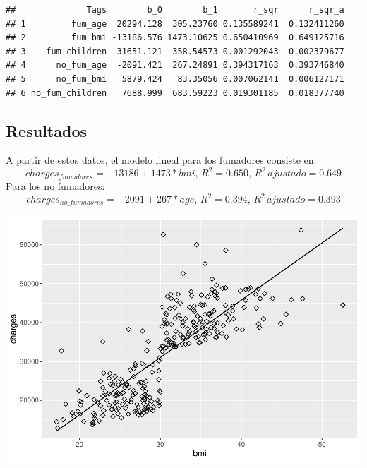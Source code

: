 \documentclass[]{article}
\newenvironment{Shaded}{\begin{snugshade}}{\end{snugshade}}
\newcommand{\AttributeTok}[1]{\textcolor[rgb]{0.77,0.63,0.00}{#1}}
\newcommand{\DecValTok}[1]{\textcolor[rgb]{0.00,0.00,0.81}{#1}}
\newcommand{\FunctionTok}[1]{\textcolor[rgb]{0.00,0.00,0.00}{#1}}
\newcommand{\NormalTok}[1]{#1}
\newcommand{\SpecialCharTok}[1]{\textcolor[rgb]{0.00,0.00,0.00}{#1}}
\begin{document}
\begin{verbatim}
##              Tags        b_0        b_1       r_sqr      r_sqr_a
## 1         fum_age  20294.128  305.23760 0.135589241  0.132411260
## 2         fum_bmi -13186.576 1473.10625 0.650410969  0.649125716
## 3    fum_children  31651.121  358.54573 0.001292043 -0.002379677
## 4      no_fum_age  -2091.421  267.24891 0.394317163  0.393746840
## 5      no_fum_bmi   5879.424   83.35056 0.007062141  0.006127171
## 6 no_fum_children   7688.999  683.59223 0.019301185  0.018377740
\end{verbatim}

\hypertarget{resultados}{%
\subsection{Resultados}\label{resultados}}

A partir de estos datos, el modelo lineal para los fumadores consiste
en:
\[charges_{fumadores} = -13186 + 1473 * bmi,\,  R^2 = 0.650,\, R^2 \, ajustado = 0.649\]
Para los no fumadores:
\[charges_{no\_fumadores} = -2091 + 267 * age,\,  R^2 = 0.394,\, R^2 \, ajustado = 0.393\]

\begin{Shaded}
\end{Shaded}

\includegraphics{Enunciado_Tarea_3_files/figure-latex/unnamed-chunk-17-1.pdf}
\end{document}
